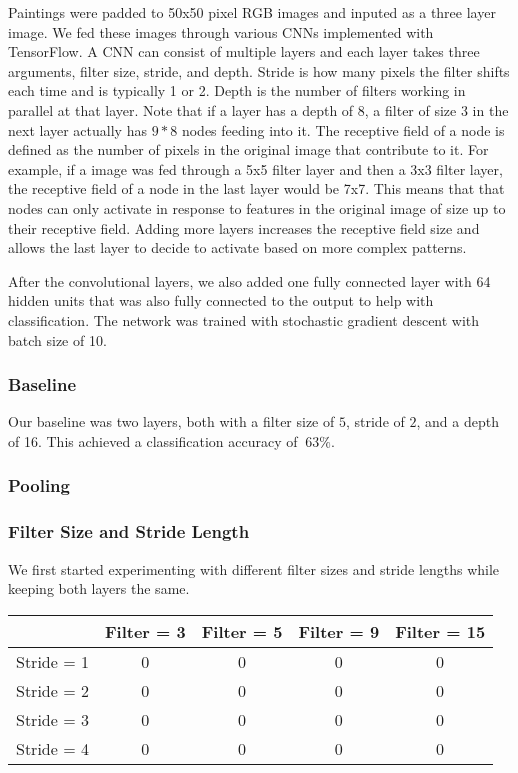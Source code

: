 \documentclass[10pt,twoside]{article}
\begin{document}
\noindent Paintings were padded to 50x50 pixel RGB images and inputed as a three layer image. We fed these images through various CNNs implemented with TensorFlow. A CNN can consist of multiple layers and each layer takes three arguments, filter size, stride, and depth. Stride is how many pixels the filter shifts each time and is typically 1 or 2. Depth is the number of filters working in parallel at that layer. Note that if a layer has a depth of 8, a filter of size 3 in the next layer actually has $9*8$ nodes feeding into it. The receptive field of a node is defined as the number of pixels in the original image that contribute to it. For example, if a image was fed through a 5x5 filter layer and then a 3x3 filter layer, the receptive field of a node in the last layer would be 7x7. This means that that nodes can only activate in response to features in the original image of size up to their receptive field. Adding more layers increases the receptive field size and allows the last layer to decide to activate based on more complex patterns.

After the convolutional layers, we also added one fully connected layer with 64 hidden units that was also fully connected to the output to help with classification. The network was trained with stochastic gradient descent with batch size of 10.

\subsubsection{Baseline}
 Our baseline was two layers, both with a filter size of $5$, stride of $2$, and a depth of 16. This achieved a classification accuracy of $~63\%$. 

\subsubsection{Pooling}

\subsubsection{Filter Size and Stride Length}

 We first started experimenting with different filter sizes and stride lengths while keeping both layers the same.

\begin{center}
 \begin{tabular}{||c c c c c||} 
 \hline
  & Filter = 3 & Filter = 5 & Filter = 9 & Filter = 15 \\ [0.5ex] 
 \hline\hline
 Stride = 1 & 0 & 0 & 0 & 0 \\ 
 \hline
 Stride = 2 & 0 & 0 & 0 & 0 \\
 \hline
 Stride = 3 & 0 & 0 & 0 & 0 \\
 \hline
 Stride = 4 & 0 & 0 & 0 & 0 \\
 \hline
\end{tabular}
\end{center}
\end{document}
